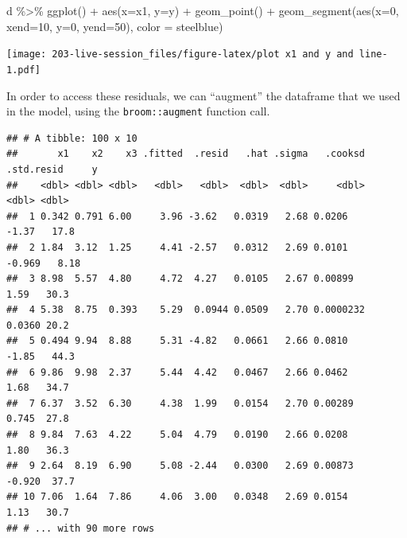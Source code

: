 \documentclass[
]{book}
\newenvironment{Shaded}{\begin{snugshade}}{\end{snugshade}}
\newcommand{\AttributeTok}[1]{\textcolor[rgb]{0.77,0.63,0.00}{#1}}
\newcommand{\DecValTok}[1]{\textcolor[rgb]{0.00,0.00,0.81}{#1}}
\newcommand{\FunctionTok}[1]{\textcolor[rgb]{0.00,0.00,0.00}{#1}}
\newcommand{\NormalTok}[1]{#1}
\newcommand{\OtherTok}[1]{\textcolor[rgb]{0.56,0.35,0.01}{#1}}
\newcommand{\SpecialCharTok}[1]{\textcolor[rgb]{0.00,0.00,0.00}{#1}}
\newcommand{\StringTok}[1]{\textcolor[rgb]{0.31,0.60,0.02}{#1}}
\theoremstyle{definition}
\theoremstyle{definition}
\theoremstyle{definition}
\theoremstyle{definition}
\theoremstyle{remark}
\begin{document}
\begin{Shaded}
\begin{Highlighting}[]
\NormalTok{d }\SpecialCharTok{\%\textgreater{}\%} 
  \FunctionTok{ggplot}\NormalTok{() }\SpecialCharTok{+} 
  \FunctionTok{aes}\NormalTok{(}\AttributeTok{x=}\NormalTok{x1, }\AttributeTok{y=}\NormalTok{y) }\SpecialCharTok{+} 
  \FunctionTok{geom\_point}\NormalTok{() }\SpecialCharTok{+} 
  \FunctionTok{geom\_segment}\NormalTok{(}\FunctionTok{aes}\NormalTok{(}\AttributeTok{x=}\DecValTok{0}\NormalTok{, }\AttributeTok{xend=}\DecValTok{10}\NormalTok{, }\AttributeTok{y=}\DecValTok{0}\NormalTok{, }\AttributeTok{yend=}\DecValTok{50}\NormalTok{), }\AttributeTok{color =} \StringTok{\textquotesingle{}steelblue\textquotesingle{}}\NormalTok{)}
\end{Highlighting}
\end{Shaded}

\texttt{[image: 203-live-session\_files/figure-latex/plot x1 and y and line-1.pdf]}

In order to access these residuals, we can ``augment'' the dataframe that we used in the model, using the \texttt{broom::augment} function call.

\begin{Shaded}
\end{Shaded}

\begin{verbatim}
## # A tibble: 100 x 10
##       x1    x2    x3 .fitted  .resid   .hat .sigma   .cooksd .std.resid     y
##    <dbl> <dbl> <dbl>   <dbl>   <dbl>  <dbl>  <dbl>     <dbl>      <dbl> <dbl>
##  1 0.342 0.791 6.00     3.96 -3.62   0.0319   2.68 0.0206       -1.37   17.8 
##  2 1.84  3.12  1.25     4.41 -2.57   0.0312   2.69 0.0101       -0.969   8.18
##  3 8.98  5.57  4.80     4.72  4.27   0.0105   2.67 0.00899       1.59   30.3 
##  4 5.38  8.75  0.393    5.29  0.0944 0.0509   2.70 0.0000232     0.0360 20.2 
##  5 0.494 9.94  8.88     5.31 -4.82   0.0661   2.66 0.0810       -1.85   44.3 
##  6 9.86  9.98  2.37     5.44  4.42   0.0467   2.66 0.0462        1.68   34.7 
##  7 6.37  3.52  6.30     4.38  1.99   0.0154   2.70 0.00289       0.745  27.8 
##  8 9.84  7.63  4.22     5.04  4.79   0.0190   2.66 0.0208        1.80   36.3 
##  9 2.64  8.19  6.90     5.08 -2.44   0.0300   2.69 0.00873      -0.920  37.7 
## 10 7.06  1.64  7.86     4.06  3.00   0.0348   2.69 0.0154        1.13   30.7 
## # ... with 90 more rows
\end{verbatim}
\end{document}
